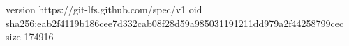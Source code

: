 version https://git-lfs.github.com/spec/v1
oid sha256:eab2f4119b186cee7d332cab08f28d59a985031191211dd979a2f44258799cec
size 174916
